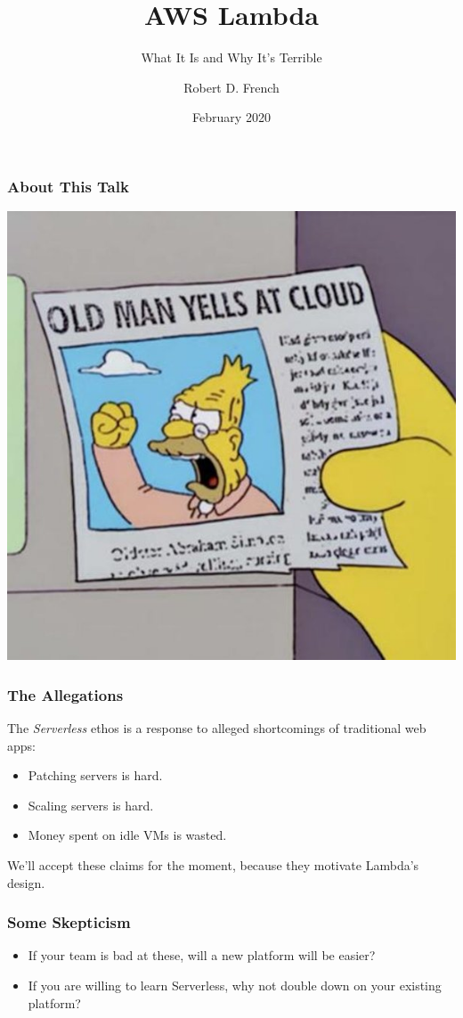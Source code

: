 \documentclass{beamer}
\title{AWS Lambda}
\subtitle{What It Is and Why It's Terrible}
\author{Robert D. French}
\date{February 2020}
\begin{document}
\frame{\titlepage}

\begin{frame}
	\frametitle{About This Talk}
	\centering
	\includegraphics[scale=0.35]{cloud.jpg}
\end{frame}

\begin{frame}
	\frametitle{The Allegations}
	The \emph{Serverless} ethos is a response to alleged shortcomings of traditional
	web apps:
	\begin{itemize}
		\pause \item Patching servers is hard.
		\pause \item Scaling servers is hard.
		\pause \item Money spent on idle VMs is wasted.
	\end{itemize}
	\pause
	We'll accept these claims for the moment, because they motivate Lambda's design.
\end{frame}

\begin{frame}
	\frametitle{Some Skepticism}
	\begin{itemize}
		\item If your team is bad at these, will a new platform will be easier?
		\pause \item If you are willing to learn Serverless, why not double down
			on your existing platform?
	\end{itemize}
\end{frame}
\end{document}
